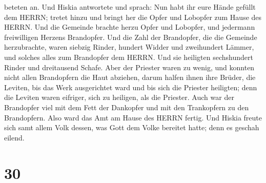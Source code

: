 beteten an.  Und Hiskia antwortete und sprach: Nun habt ihr
eure Hände gefüllt dem HERRN; tretet hinzu und bringt her die Opfer und
Lobopfer zum Hause des HERRN. Und die Gemeinde brachte herzu Opfer und
Lobopfer, und jedermann freiwilligen Herzens Brandopfer. 
Und die Zahl der Brandopfer, die die Gemeinde herzubrachte, waren
siebzig Rinder, hundert Widder und zweihundert Lämmer, und solches alles
zum Brandopfer dem HERRN.  Und sie heiligten sechshundert
Rinder und dreitausend Schafe.  Aber der Priester waren zu
wenig, und konnten nicht allen Brandopfern die Haut abziehen, darum
halfen ihnen ihre Brüder, die Leviten, bis das Werk ausgerichtet ward
und bis sich die Priester heiligten; denn die Leviten waren eifriger,
sich zu heiligen, als die Priester.  Auch war der
Brandopfer viel mit dem Fett der Dankopfer und mit den Trankopfern zu
den Brandopfern. Also ward das Amt am Hause des HERRN fertig.
 Und Hiskia freute sich samt allem Volk dessen, was Gott
dem Volke bereitet hatte; denn es geschah eilend.

\hypertarget{section-29}{%
\section{30}\label{section-29}}

